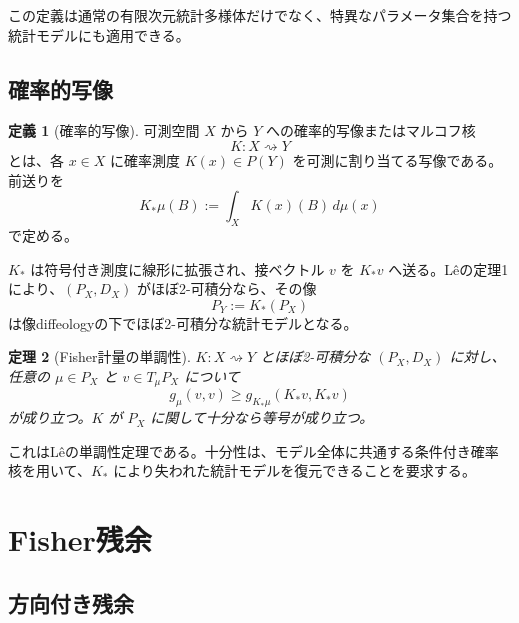 \documentclass[a4paper,11pt]{ltjsarticle}
\theoremstyle{definition}
\newtheorem{definition}{定義}[section]
\theoremstyle{plain}
\newtheorem{theorem}[definition]{定理}
\begin{document}
この定義は通常の有限次元統計多様体だけでなく、特異なパラメータ集合を持つ統計モデルにも適用できる\cite{Le2020DiffeologicalStatistics,AyJostLeSchwachhofer2017}。

\subsection{確率的写像}

\begin{definition}[確率的写像]
可測空間 $X$ から $Y$ への確率的写像またはマルコフ核
\begin{equation}
 K:X\rightsquigarrow Y
\end{equation}
とは、各 $x\in X$ に確率測度 $K(x)\in P(Y)$ を可測に割り当てる写像である。前送りを
\begin{equation}
 K_*\mu(B)
 :=
 \int_X K(x)(B)\,d\mu(x)
 \label{eq:kernel-pushforward}
\end{equation}
で定める。
\end{definition}

$K_*$ は符号付き測度に線形に拡張され、接ベクトル $v$ を $K_*v$ へ送る。Lêの定理1により、$(P_X,D_X)$ がほぼ2-可積分なら、その像
\begin{equation}
 P_Y:=K_*(P_X)
\end{equation}
は像diffeologyの下でほぼ2-可積分な統計モデルとなる\cite{Le2020DiffeologicalStatistics}。

\begin{theorem}[Fisher計量の単調性]
$K:X\rightsquigarrow Y$ とほぼ2-可積分な $(P_X,D_X)$ に対し、任意の $\mu\in P_X$ と $v\in T_\mu P_X$ について
\begin{equation}
 g_\mu(v,v)
 \geq
 g_{K_*\mu}(K_*v,K_*v)
 \label{eq:fisher-monotonicity}
\end{equation}
が成り立つ。$K$ が $P_X$ に関して十分なら等号が成り立つ。
\end{theorem}

これはLêの単調性定理である\cite[Theorem~2]{Le2020DiffeologicalStatistics}。十分性は、モデル全体に共通する条件付き確率核を用いて、$K_*$ により失われた統計モデルを復元できることを要求する\cite{JostLeLuuTran2019}。

\section{Fisher残余}

\subsection{方向付き残余}
\end{document}
